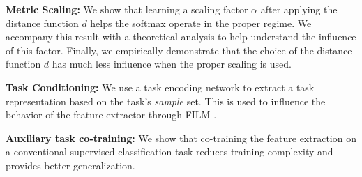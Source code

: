 \documentclass{article}
\newcommand{\tocite}[1]{[{\color{red} cite #1}]}
\begin{document}

\textbf{Metric Scaling:} We show that learning a scaling factor $\alpha$ after applying the distance function $d$ helps the softmax operate in the proper regime. We accompany this result with a theoretical analysis to help understand the influence of this factor. Finally, we empirically demonstrate that the choice of the distance function $d$ has much less influence when the proper scaling is used.

\textbf{Task Conditioning:} We use a task encoding network to extract a task representation based on the task's \emph{sample} set. This is used to influence the behavior of the feature extractor through FILM \citep{perez2017film}.

\textbf{Auxiliary task co-training:} We show that co-training the feature extraction on a conventional supervised classification task reduces training complexity and provides better generalization.


\end{document}
